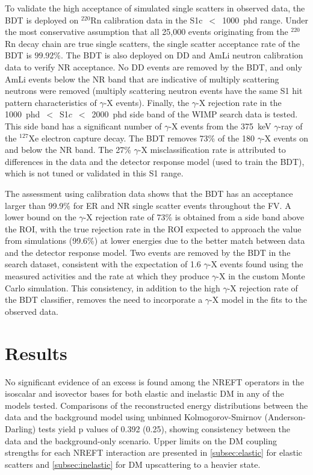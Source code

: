 \documentclass[reprint, showpacs,
preprintnumbers,
amsmath,amssymb,
aps, floatfix,
superscriptaddress,
prd, nofootinbib]{revtex4-1}
\begin{document}
To validate the high acceptance of simulated single scatters in observed data, the BDT is deployed on $^{220}$Rn calibration data in the S1c~$<$~1000~phd range.
Under the most conservative assumption that all 25,000 events originating from the $^{220}$Rn decay chain are true single scatters, the single scatter acceptance rate of the BDT is $99.92$\%. 
The BDT is also deployed on DD and AmLi neutron calibration data to verify NR acceptance. 
No DD events are removed by the BDT, and only AmLi events below the NR band that are indicative of multiply scattering neutrons were removed (multiply scattering neutron events have the same S1 hit pattern characteristics of $\gamma$-X events). 
Finally, the $\gamma$-X rejection rate in the 1000~phd~$<$~S1$c$~$<$~2000~phd side band of the WIMP search data is tested.
This side band has a significant number of $\gamma$-X events from the 375~keV $\gamma$-ray of the $^{127}$Xe electron capture decay.
The BDT removes 73\% of the 180 $\gamma$-X events on and below the NR band.
The 27\% $\gamma$-X misclassification rate is attributed to differences in the data and the detector response model (used to train the BDT), which is not tuned or validated in this S1 range. 


The assessment using calibration data shows that the BDT has an acceptance larger than 99.9\% for ER and NR single scatter events throughout the FV.  
A lower bound on the $\gamma$-X rejection rate of 73\% is obtained from a side band above the ROI, with the true rejection rate in the ROI expected to approach the value from simulations (99.6\%) at lower energies due to the better match between data and the detector response model. 
Two events are removed by the BDT in the search dataset, consistent with the expectation of 1.6 $\gamma$-X events found using the measured activities and the rate at which they produce $\gamma$-X in the custom Monte Carlo simulation.
This consistency, in addition to the high $\gamma$-X rejection rate of the BDT classifier, removes the need to incorporate a $\gamma$-X model in the fits to the observed data. 

\section{\label{sec:results}Results}
No significant evidence of an excess is found among the NREFT operators in the isoscalar and isovector bases for both elastic and inelastic DM in any of the models tested. 
Comparisons of the reconstructed energy distributions between the data and the background model using unbinned Kolmogorov-Smirnov (Anderson-Darling) tests yield p values of 0.392 (0.25), showing consistency between the data and the background-only scenario.
Upper limits on the DM coupling strengths for each NREFT interaction are presented in \autoref{subsec:elastic} for elastic scatters and \cref{subsec:inelastic} for DM upscattering to a heavier state.
\end{document}
